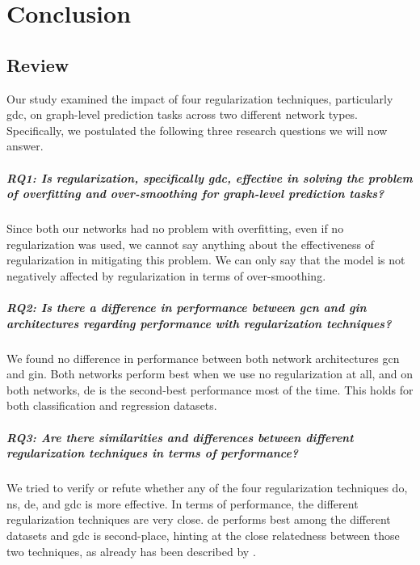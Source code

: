 %
\chapter{Conclusion}
\label{sec:conclusion}




\section{Review}
\label{sec:conclusion:review}

Our study examined the impact of four regularization techniques, particularly \ac{gdc}, on graph-level prediction tasks across two different network types.
Specifically, we postulated the following three research questions we will now answer.

\paragraph{RQ1: Is regularization, specifically \acs*{gdc}, effective in solving the problem of overfitting and over-smoothing for graph-level prediction tasks?}
Since both our networks had no problem with overfitting, even if no regularization was used, we cannot say anything about the effectiveness of regularization in mitigating this problem.
We can only say that the model is not negatively affected by regularization in terms of over-smoothing.

\paragraph{RQ2: Is there a difference in performance between \acs*{gcn} and \acs*{gin} architectures regarding performance with regularization techniques?}

We found no difference in performance between both network architectures \ac{gcn} and \ac{gin}.
Both networks perform best when we use no regularization at all, and on both networks, \ac{de} is the second-best performance most of the time.
This holds for both classification and regression datasets.


\paragraph{RQ3: Are there similarities and differences between different regularization techniques in terms of performance?}
We tried to verify or refute whether any of the four regularization techniques \ac{do}, \ac{ns}, \ac{de}, and \ac{gdc} is more effective.
In terms of performance, the different regularization techniques are very close.
\Ac{de} performs best among the different datasets and \ac{gdc} is second-place, hinting at the close relatedness between those two techniques, as already has been described by \citep{Hasanzadeh2020}.



